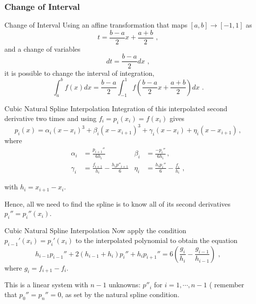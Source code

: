 \documentclass[11pt]{beamer}
\begin{document}
\subsubsection{Change of Interval}
\begin{frame}[fragile]{Change of Interval}
Using an affine transformation that maps $[a,b]
\rightarrow [-1,1]$ as 
\begin{equation}
t = \frac{b-a}{2} x + \frac{a+b}{2}\,\,,
\end{equation}
and a change of variables
\begin{equation}
dt = \frac{b-a}{2} dx\,\,,
\end{equation}
it is possible to change the interval of integration, 
\begin{equation}
 \int_{a}^{b} f(x) dx = \frac{b-a}{2} \int_{-1}^1 f\left(\frac{b-a}{2}x + \frac{a+b}{2}\right) dx\,\,.
\end{equation}
\end{frame}

\begin{frame}[fragile]{Cubic Natural Spline Interpolation}
Integration of this interpolated second derivative two times and using $f_i =
p_i(x_i) = f(x_i)$ gives
\begin{equation}
p_i(x) = \alpha_i (x-x_i)^3 + \beta_i (x-x_{i+1})^3 + \gamma_i (x-x_i) + 
\eta_i(x-x_{i+1})\,,
\end{equation}
where
\begin{align}
\alpha_i &= \frac{p_{i+1}''}{6 h_i} &\beta_i &= \frac{-p_i''}{6h_i}\,,\\
\gamma_i &= \frac{f_{i+1}}{h_i} - \frac{h_i p''_{i+1}}{6}
&\eta_i &= \frac{h_i p_i''}{6} - \frac{f_i}{h_i}\,\,,
\end{align}

with $h_i = x_{i+1} - x_{i}$. 
\pause
\bigskip

Hence, all we need to find the spline is
to know all of its second derivatives $p_i'' = p_i''(x_i)$.
\end{frame}

\begin{frame}[fragile]{Cubic Natural Spline Interpolation}
Now apply the condition $p_{i-1}'(x_i) = p_i'(x_i)$ to the interpolated polynomial to obtain the equation
\begin{equation}
h_{i-1}p_{i-1}'' + 2 (h_{i-1} + h_i)p_i'' + h_i p_{i+1}'' = 
6 \left( \frac{g_i}{h_i} - \frac{g_{i-1}}{h_{i-1}}\right)\,\,,
\end{equation}
where $g_i = f_{i+1} - f_i$.\\
\pause
\bigskip
 
This is a linear system with $n-1$ unknowns:
$p''_i$ for $i=1,\cdots,n-1$ ( remember that $p_0'' = p_n'' = 0$, as set by the natural
spline condition.
\end{frame}
\end{document}
